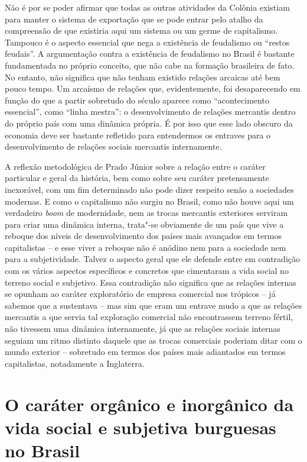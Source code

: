 Não é por se poder afirmar que todas as outras atividades da Colônia
existiam para manter o sistema de exportação que se pode entrar pelo
atalho da compreensão de que existiria aqui um sistema ou um germe de
capitalismo. Tampouco é o aspecto essencial que nega a existência de
feudalismo ou ``restos feudais''. A argumentação contra a existência de
feudalismo no Brasil é bastante fundamentada no próprio conceito, que
não cabe na formação brasileira de fato. No entanto, não significa que
não tenham existido relações arcaicas até bem pouco tempo. Um arcaísmo
de relações que, evidentemente, foi desaparecendo em função do que a
partir sobretudo do século  aparece como ``acontecimento essencial'',
como ``linha mestra'': o desenvolvimento de relações mercantis dentro do
próprio país com uma dinâmica própria. É por isso que esse lado obscuro
da economia deve ser bastante refletido para entendermos os entraves
para o desenvolvimento de relações sociais mercantis internamente.

A reflexão metodológica de Prado Júnior sobre a relação entre o caráter
particular e geral da história, bem como sobre seu caráter pretensamente
inexorável, com um fim determinado não pode dizer respeito senão a
sociedades modernas. E como o capitalismo não surgiu no Brasil, como não
houve aqui um verdadeiro \emph{boom} de modernidade, nem as trocas
mercantis exteriores serviram para criar uma dinâmica interna, trata"-se
obviamente de um país que vive a reboque dos níveis de desenvolvimento
dos países mais avançados em termos capitalistas -- e esse viver a
reboque não é anódino nem para a sociedade nem para a subjetividade.
Talvez o aspecto geral que ele defende entre em contradição com os
vários aspectos específicos e concretos que cimentaram a vida social no
terreno social e subjetivo. Essa contradição não significa que as
relações internas se opunham ao caráter exploratório de empresa
comercial nos trópicos -- já sabemos que a sustentava -- mas sim que
eram um entrave mudo a que as relações mercantis a que servia tal
exploração comercial não encontrassem terreno fértil, não tivessem uma
dinâmica internamente, já que as relações sociais internas seguiam um
ritmo distinto daquele que as trocas comerciais poderiam ditar com o
mundo exterior -- sobretudo em termos dos países mais adiantados em
termos capitalistas, notadamente a Inglaterra.

\section{O caráter orgânico e inorgânico da vida social e subjetiva burguesas no Brasil}


